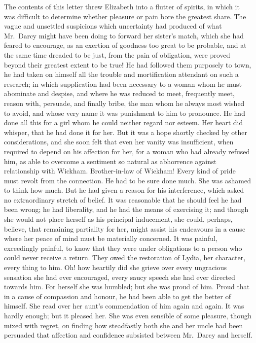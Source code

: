 The contents of this letter threw Elizabeth into a flutter
of spirits, in which it was difficult to determine whether
pleasure or pain bore the greatest share. The vague and
unsettled suspicions which uncertainty had produced of
what Mr.\ Darcy might have been doing to forward her
sister’s match, which she had feared to encourage, as an
exertion of goodness too great to be probable, and at the
same time dreaded to be just, from the pain of obligation,
were proved beyond their greatest extent to be true!
He had followed them purposely to town, he had taken
on himself all the trouble and mortification attendant on
such a research; in which supplication had been necessary
to a woman whom he must abominate and despise, and
where he was reduced to meet, frequently meet, reason
with, persuade, and finally bribe, the man whom he always
most wished to avoid, and whose very name it was punishment
to him to pronounce. He had done all this for
a girl whom he could neither regard nor esteem. Her
heart did whisper, that he had done it for her. But it
was a hope shortly checked by other considerations, and
she soon felt that even her vanity was insufficient, when
required to depend on his affection for her, for a woman
who had already refused him, as able to overcome a sentiment
so natural as abhorrence against relationship with
Wickham. Brother-in-law of Wickham! Every kind of
pride must revolt from the connection. He had to be sure
done much. She was ashamed to think how much. But
he had given a reason for his interference, which asked
no extraordinary stretch of belief. It was reasonable that
he should feel he had been wrong; he had liberality, and
he had the means of exercising it; and though she would
not place herself as his principal inducement, she could,
perhaps, believe, that remaining partiality for her, might
assist his endeavours in a cause where her peace of mind
must be materially concerned. It was painful, exceedingly
painful, to know that they were under obligations
to a person who could never receive a return. They owed
the restoration of Lydia, her character, every thing to
him. Oh! how heartily did she grieve over every ungracious
sensation she had ever encouraged, every saucy
speech she had ever directed towards him. For herself
she was humbled; but she was proud of him. Proud that
in a cause of compassion and honour, he had been able
to get the better of himself. She read over her aunt’s
commendation of him again and again. It was hardly
enough; but it pleased her. She was even sensible of
some pleasure, though mixed with regret, on finding how
steadfastly both she and her uncle had been persuaded
that affection and confidence subsisted between Mr.\ Darcy
and herself.

